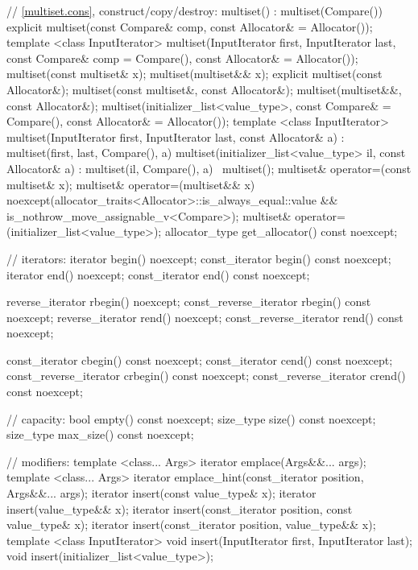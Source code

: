 \begin{codeblock}
{{    // \ref{multiset.cons}, construct/copy/destroy:
    multiset() : multiset(Compare()) { }
    explicit multiset(const Compare& comp, const Allocator& = Allocator());
    template <class InputIterator>
      multiset(InputIterator first, InputIterator last,
               const Compare& comp = Compare(), const Allocator& = Allocator());
    multiset(const multiset& x);
    multiset(multiset&& x);
    explicit multiset(const Allocator&);
    multiset(const multiset&, const Allocator&);
    multiset(multiset&&, const Allocator&);
    multiset(initializer_list<value_type>, const Compare& = Compare(),
             const Allocator& = Allocator());
    template <class InputIterator>
      multiset(InputIterator first, InputIterator last, const Allocator& a)
        : multiset(first, last, Compare(), a) { }
    multiset(initializer_list<value_type> il, const Allocator& a)
      : multiset(il, Compare(), a) { }
    ~multiset();
    multiset& operator=(const multiset& x);
    multiset& operator=(multiset&& x)
      noexcept(allocator_traits<Allocator>::is_always_equal::value &&
               is_nothrow_move_assignable_v<Compare>);
    multiset& operator=(initializer_list<value_type>);
    allocator_type get_allocator() const noexcept;

    // iterators:
    iterator               begin() noexcept;
    const_iterator         begin() const noexcept;
    iterator               end() noexcept;
    const_iterator         end() const noexcept;

    reverse_iterator       rbegin() noexcept;
    const_reverse_iterator rbegin() const noexcept;
    reverse_iterator       rend() noexcept;
    const_reverse_iterator rend() const noexcept;

    const_iterator         cbegin() const noexcept;
    const_iterator         cend() const noexcept;
    const_reverse_iterator crbegin() const noexcept;
    const_reverse_iterator crend() const noexcept;

    // capacity:
    bool      empty() const noexcept;
    size_type size() const noexcept;
    size_type max_size() const noexcept;

    // modifiers:
    template <class... Args> iterator emplace(Args&&... args);
    template <class... Args> iterator emplace_hint(const_iterator position, Args&&... args);
    iterator insert(const value_type& x);
    iterator insert(value_type&& x);
    iterator insert(const_iterator position, const value_type& x);
    iterator insert(const_iterator position, value_type&& x);
    template <class InputIterator>
      void insert(InputIterator first, InputIterator last);
    void insert(initializer_list<value_type>);

}}
\end{codeblock}
